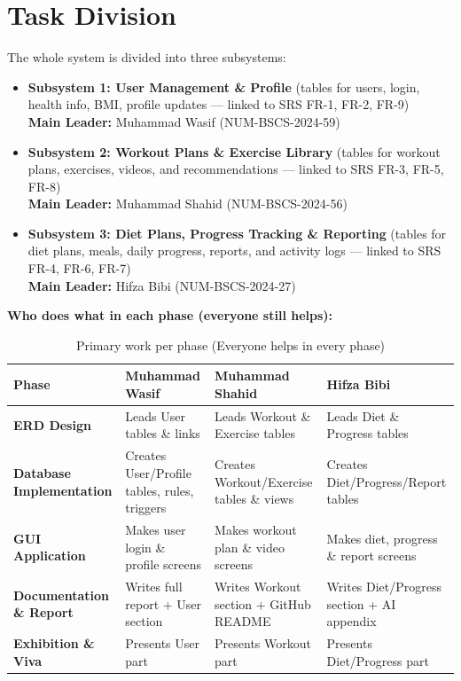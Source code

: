 \documentclass[12pt,a4paper]{article}
\begin{document}
\section{Task Division}
The whole system is divided into three subsystems:

\begin{itemize}
    \item \textbf{Subsystem 1: User Management \& Profile} (tables for users, login, health info, BMI, profile updates — linked to SRS FR-1, FR-2, FR-9) \\
    \textbf{Main Leader:} Muhammad Wasif (NUM-BSCS-2024-59)
    
    \item \textbf{Subsystem 2: Workout Plans \& Exercise Library} (tables for workout plans, exercises, videos, and recommendations — linked to SRS FR-3, FR-5, FR-8) \\
    \textbf{Main Leader:} Muhammad Shahid (NUM-BSCS-2024-56)
    
    \item \textbf{Subsystem 3: Diet Plans, Progress Tracking \& Reporting} (tables for diet plans, meals, daily progress, reports, and activity logs — linked to SRS FR-4, FR-6, FR-7) \\
    \textbf{Main Leader:} Hifza Bibi (NUM-BSCS-2024-27)
\end{itemize}

\textbf{Who does what in each phase (everyone still helps):}

\begin{table}[h]
\centering
\small
\begin{tabular}{|p{2.8cm}|p{3.2cm}|p{3.2cm}|p{3.2cm}|}
\hline
\textbf{Phase} & \textbf{Muhammad Wasif} & \textbf{Muhammad Shahid} & \textbf{Hifza Bibi} \\
\hline
\textbf{ERD Design} 
& Leads User tables \& links & Leads Workout \& Exercise tables & Leads Diet \& Progress tables \\

\hline
\textbf{Database Implementation} 
& Creates User/Profile tables, rules, triggers & Creates Workout/Exercise tables \& views & Creates Diet/Progress/Report tables \\

\hline
\textbf{GUI Application} 
& Makes user login \& profile screens & Makes workout plan \& video screens & Makes diet, progress \& report screens \\

\hline
\textbf{Documentation \& Report} 
& Writes full report + User section & Writes Workout section + GitHub README & Writes Diet/Progress section + AI appendix \\
\hline
\textbf{Exhibition \& Viva} 
& Presents User part & Presents Workout part & Presents Diet/Progress part \\

\hline
\end{tabular}
\caption{Primary work per phase (Everyone helps in every phase)}
\end{table}
\end{document}

